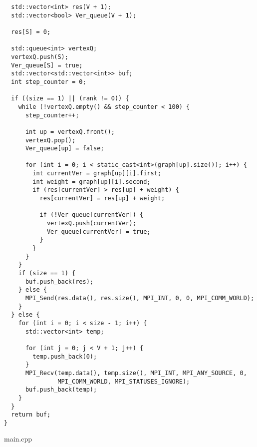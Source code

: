 \documentclass{report}
\begin{document}
\begin{lstlisting}
  std::vector<int> res(V + 1);
  std::vector<bool> Ver_queue(V + 1);

  res[S] = 0;

  std::queue<int> vertexQ;
  vertexQ.push(S);
  Ver_queue[S] = true;
  std::vector<std::vector<int>> buf;
  int step_counter = 0;

  if ((size == 1) || (rank != 0)) {
    while (!vertexQ.empty() && step_counter < 100) {
      step_counter++;

      int up = vertexQ.front();
      vertexQ.pop();
      Ver_queue[up] = false;

      for (int i = 0; i < static_cast<int>(graph[up].size()); i++) {
        int currentVer = graph[up][i].first;
        int weight = graph[up][i].second;
        if (res[currentVer] > res[up] + weight) {
          res[currentVer] = res[up] + weight;

          if (!Ver_queue[currentVer]) {
            vertexQ.push(currentVer);
            Ver_queue[currentVer] = true;
          }
        }
      }
    }
    if (size == 1) {
      buf.push_back(res);
    } else {
      MPI_Send(res.data(), res.size(), MPI_INT, 0, 0, MPI_COMM_WORLD);
    }
  } else {
    for (int i = 0; i < size - 1; i++) {
      std::vector<int> temp;

      for (int j = 0; j < V + 1; j++) {
        temp.push_back(0);
      }
      MPI_Recv(temp.data(), temp.size(), MPI_INT, MPI_ANY_SOURCE, 0,
               MPI_COMM_WORLD, MPI_STATUSES_IGNORE);
      buf.push_back(temp);
    }
  }
  return buf;
}

\end{lstlisting}
main.cpp
\end{document}
